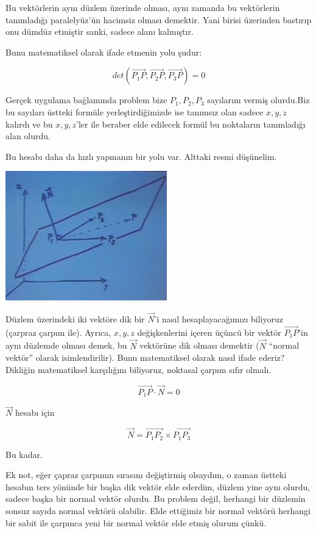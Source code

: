 \documentclass[12pt,fleqn]{article}\usepackage{../../common}
\begin{document}
Bu vektörlerin aynı düzlem üzerinde olması, aynı zamanda bu vektörlerin
tanımladığı paralelyüz'ün hacimsiz olması demektir. Yani birisi
üzerinden bastırıp onu dümdüz etmiştir sanki, sadece alanı kalmıştır. 

Bunu matematiksel olarak ifade etmenin yolu şudur:

$$ det(\vec{P_1P},\vec{P_2P},\vec{P_3P}) = 0 $$

Gerçek uygulama bağlamında problem bize $P_1,P_2,P_3$ sayılarını vermiş
olurdu.Biz bu sayıları üstteki formüle yerleştirdiğimizde ise tanımsız olan
sadece $x,y,z$ kalırdı ve bu $x,y,z$'ler ile beraber elde edilecek formül bu
noktaların tanımladığı alan olurdu.

Bu hesabı daha da hızlı yapmanın bir yolu var. Alttaki resmi düşünelim. 

\begin{center}


\includegraphics[width=7cm]{3_3.png}


\end{center}

Düzlem üzerindeki iki vektöre dik bir $\vec{N}$'i nasıl
hesaplayacağımızı biliyoruz (çarpraz çarpım ile). Ayrıca, $x,y,z$
değişkenlerini içeren üçüncü bir vektör $\vec{P_1P}$'in aynı düzlemde
olması demek, bu $\vec{N}$ vektörüne dik olması demektir ($\vec{N}$
``normal vektör'' olarak isimlendirilir). Bunu matematiksel olarak nasıl
ifade ederiz? Dikliğin matematiksel karşılığını biliyoruz, noktasal çarpım
sıfır olmalı.

$$ \vec{P_1P} \cdot \vec{N} = 0 $$

$\vec{N}$ hesabı için 

$$ \vec{N} = \vec{P_1P_2} \times \vec{P_1P_3}$$

Bu kadar. 

Ek not, eğer çapraz çarpımın sırasını değiştirmiş olsaydım, o zaman üstteki
hesabın ters yönünde bir başka dik vektör elde ederdim, düzlem yine aynı
olurdu, sadece başka bir normal vektör olurdu. Bu problem değil, herhangi
bir düzlemin sonsuz sayıda normal vektörü olabilir. Elde ettiğimiz bir
normal vektörü herhangi bir sabit ile çarpınca yeni bir normal vektör elde
etmiş olurum çünkü. 
\end{document}

